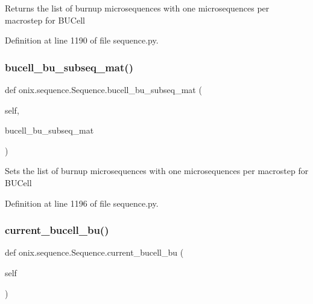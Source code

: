 \begin{DoxyVerb}Returns the list of burnup microsequences with one microsequences per macrostep
for BUCell\end{DoxyVerb}
 

Definition at line 1190 of file sequence.\+py.

\mbox{\label{classonix_1_1sequence_1_1Sequence_a21ed9134f910c51c49e264e4a53db745}} 
\subsubsection{\texorpdfstring{bucell\+\_\+bu\+\_\+subseq\+\_\+mat()}{bucell\_bu\_subseq\_mat()}\hspace{0.1cm}{\footnotesize\ttfamily [2/2]}}
{\footnotesize\ttfamily def onix.\+sequence.\+Sequence.\+bucell\+\_\+bu\+\_\+subseq\+\_\+mat (\begin{DoxyParamCaption}\item[{}]{self,  }\item[{}]{bucell\+\_\+bu\+\_\+subseq\+\_\+mat }\end{DoxyParamCaption})}

\begin{DoxyVerb}Sets the list of burnup microsequences with one microsequences per macrostep
for BUCell\end{DoxyVerb}
 

Definition at line 1196 of file sequence.\+py.

\mbox{\label{classonix_1_1sequence_1_1Sequence_ad4fb0445831abf0eb7bbe1138f09c0b0}} 
\subsubsection{\texorpdfstring{current\+\_\+bucell\+\_\+bu()}{current\_bucell\_bu()}\hspace{0.1cm}{\footnotesize\ttfamily [1/2]}}
{\footnotesize\ttfamily def onix.\+sequence.\+Sequence.\+current\+\_\+bucell\+\_\+bu (\begin{DoxyParamCaption}\item[{}]{self }\end{DoxyParamCaption})}



